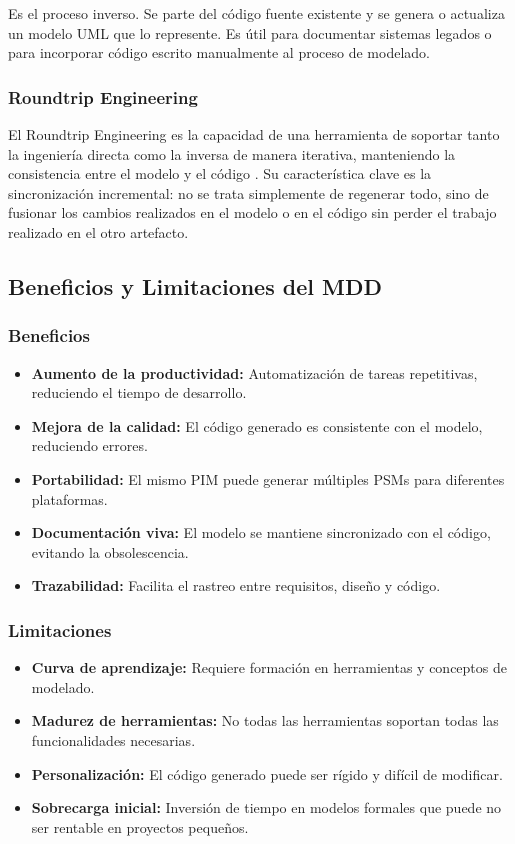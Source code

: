 \documentclass[12pt,a4paper]{article}
\begin{document}
Es el proceso inverso. Se parte del código fuente existente y se genera o actualiza un modelo UML que lo represente. Es útil para documentar sistemas legados o para incorporar código escrito manualmente al proceso de modelado.

\subsubsection{Roundtrip Engineering}

El Roundtrip Engineering es la capacidad de una herramienta de soportar tanto la ingeniería directa como la inversa de manera iterativa, manteniendo la consistencia entre el modelo y el código \cite{pohl2025}. Su característica clave es la sincronización incremental: no se trata simplemente de regenerar todo, sino de fusionar los cambios realizados en el modelo o en el código sin perder el trabajo realizado en el otro artefacto.

\subsection{Beneficios y Limitaciones del MDD}

\subsubsection{Beneficios}

\begin{itemize}
    \item \textbf{Aumento de la productividad:} Automatización de tareas repetitivas, reduciendo el tiempo de desarrollo.
    \item \textbf{Mejora de la calidad:} El código generado es consistente con el modelo, reduciendo errores.
    \item \textbf{Portabilidad:} El mismo PIM puede generar múltiples PSMs para diferentes plataformas.
    \item \textbf{Documentación viva:} El modelo se mantiene sincronizado con el código, evitando la obsolescencia.
    \item \textbf{Trazabilidad:} Facilita el rastreo entre requisitos, diseño y código.
\end{itemize}

\subsubsection{Limitaciones}

\begin{itemize}
    \item \textbf{Curva de aprendizaje:} Requiere formación en herramientas y conceptos de modelado.
    \item \textbf{Madurez de herramientas:} No todas las herramientas soportan todas las funcionalidades necesarias.
    \item \textbf{Personalización:} El código generado puede ser rígido y difícil de modificar.
    \item \textbf{Sobrecarga inicial:} Inversión de tiempo en modelos formales que puede no ser rentable en proyectos pequeños.
\end{itemize}
\end{document}
